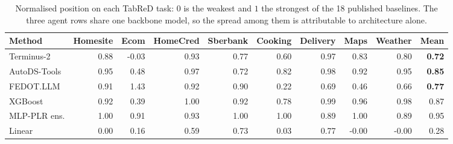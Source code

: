 \begin{table}[t]
\centering
\caption{Normalised position on each TabReD task: $0$ is the weakest and $1$ the strongest of the 18 published baselines. The three agent rows share one backbone model, so the spread among them is attributable to architecture alone.}
\label{tab:normalized}
\small
\setlength{\tabcolsep}{4pt}
\begin{tabular}{lrrrrrrrrr}
\toprule
Method & Homesite & Ecom & HomeCred & Sberbank & Cooking & Delivery & Maps & Weather & Mean \\
\midrule
Terminus-2 & 0.88 & -0.03 & 0.93 & 0.77 & 0.60 & 0.97 & 0.83 & 0.80 & \textbf{0.72} \\
AutoDS-Tools & 0.95 & 0.48 & 0.97 & 0.72 & 0.82 & 0.98 & 0.92 & 0.95 & \textbf{0.85} \\
FEDOT.LLM & 0.91 & 1.43 & 0.92 & 0.90 & 0.22 & 0.69 & 0.46 & 0.66 & \textbf{0.77} \\
\midrule
XGBoost & 0.92 & 0.39 & 1.00 & 0.92 & 0.78 & 0.99 & 0.96 & 0.98 & 0.87 \\
MLP-PLR ens. & 1.00 & 0.91 & 0.93 & 1.00 & 1.00 & 0.89 & 1.00 & 0.89 & 0.95 \\
Linear & 0.00 & 0.16 & 0.59 & 0.73 & 0.03 & 0.77 & -0.00 & -0.00 & 0.28 \\
\bottomrule
\end{tabular}
\end{table}
